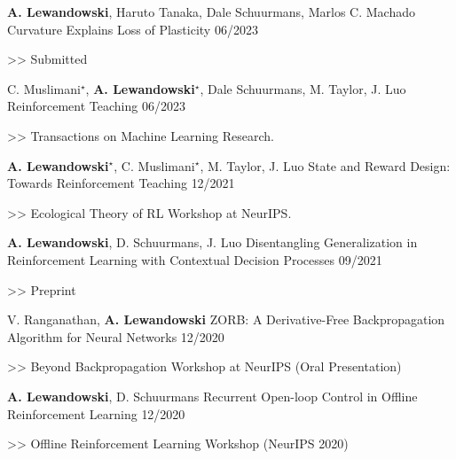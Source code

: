 \begin{cventries}
    \cventry
    {\textbf{A. Lewandowski}, Haruto Tanaka, Dale Schuurmans, Marlos C. Machado}
    {Curvature Explains Loss of Plasticity}
    {06/2023}
    {
      \begin{cvitems}
    	\item[>>] Submitted
      \end{cvitems}
    }

    \cventry
    {C. Muslimani$^{\star}$, \textbf{A. Lewandowski}$^\star$, Dale Schuurmans, M. Taylor, J. Luo}
    {Reinforcement Teaching}
    {06/2023}
    {
      \begin{cvitems}
    	\item[>>] Transactions on Machine Learning Research.
      \end{cvitems}
    }

    \cventry
    {\textbf{A. Lewandowski}$^\star$, C. Muslimani$^{\star}$, M. Taylor, J. Luo}
    {State and Reward Design: Towards Reinforcement Teaching}
    {12/2021}
    {
      \begin{cvitems}
        \item[>>] Ecological Theory of RL Workshop at NeurIPS.
      \end{cvitems}
    }

    \cventry
    {\textbf{A. Lewandowski}, D. Schuurmans, J. Luo}
    {Disentangling Generalization in Reinforcement Learning with Contextual
      Decision Processes}
    {09/2021}
    {
      \begin{cvitems}
    	\item[>>] Preprint
      \end{cvitems}
    }

    \cventry
    {V. Ranganathan, \textbf{A. Lewandowski}}
    {ZORB: A Derivative-Free Backpropagation Algorithm for Neural Networks}
    {12/2020}
    {
      \begin{cvitems}
    	\item[>>] Beyond Backpropagation Workshop at NeurIPS (Oral
      Presentation)
      \end{cvitems}
    }

    \cventry
    { \textbf{A. Lewandowski}, D. Schuurmans}
    {Recurrent Open-loop Control in Offline Reinforcement Learning}
    {12/2020}
    {
      \begin{cvitems}
    	\item[>>] Offline Reinforcement Learning Workshop (NeurIPS 2020)
      \end{cvitems}
    }


\end{cventries}
